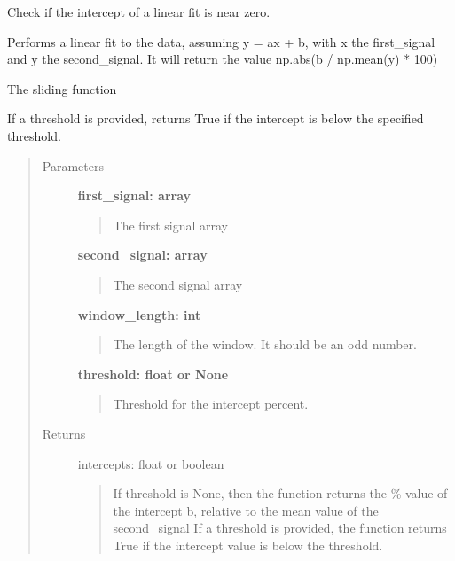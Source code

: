 \documentclass[letterpaper,10pt,english]{sphinxmanual}
\begin{document}
\begin{fulllineitems}
\label{fit_checks:fit_checks.sliding_check_linear_fit_intercept}
Check if the intercept of a linear fit is near zero.

Performs a linear fit to the data, assuming y = ax + b, with x the first\_signal
and y the second\_signal. It will return the value np.abs(b / np.mean(y) * 100)

The sliding function

If a threshold is provided, returns True if the intercept is below
the specified threshold.
\begin{quote}\begin{description}
\item[{Parameters}] \leavevmode
\textbf{first\_signal: array}
\begin{quote}

The first signal array
\end{quote}

\textbf{second\_signal: array}
\begin{quote}

The second signal array
\end{quote}

\textbf{window\_length: int}
\begin{quote}

The length of the window. It should be an odd number.
\end{quote}

\textbf{threshold: float or None}
\begin{quote}

Threshold for the intercept percent.
\end{quote}

\item[{Returns}] \leavevmode
intercepts: float or boolean
\begin{quote}

If threshold is None, then the function returns the \% value of the intercept b, relative
to the mean value of the second\_signal
If a threshold is provided, the function returns True if the intercept value is
below the threshold.
\end{quote}

\end{description}\end{quote}

\end{fulllineitems}
\end{document}
